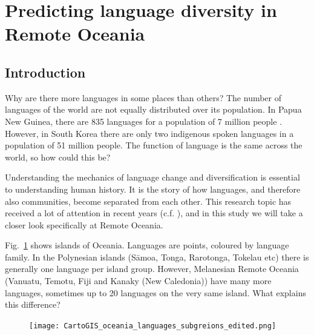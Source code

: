 \documentclass[a4paper,10pt]{article} %
\begin{document}
\newpage
{}



\newpage
\doublespacing
\section{Predicting language diversity in Remote Oceania}
\label{study_pol_complex}
\subsection{Introduction}
\doublespacing
Why are there more languages in some places than others? The number of languages of the world are not equally distributed over its population. In Papua New Guinea, there are 835 languages for a population of 7 million people \citep{ethnologue22, cia_world_factbook_2019}. However, in South Korea there are only two indigenous spoken languages in a population of 51 million people. The function of language is the same across the world, so how could this be?

Understanding the mechanics of language change and diversification is essential to understanding human history. It is the story of how languages, and therefore also communities, become separated from each other. This research topic has received a lot of attention in recent years (c.f. \citet{gavin2017process,  greenhill2015demographic, Pacheco_Coelho_2019, hua2019ecological}), and in this study we will take a closer look specifically at Remote Oceania. 

Fig.~\ref{RO_overnight_coloured_dots} shows islands of Oceania. Languages are points, coloured by language family. In the Polynesian islands (S\={a}moa, Tonga, Rarotonga, Tokelau etc) there is generally one language per island group. However, Melanesian Remote Oceania (Vanuatu, Temotu, Fiji and Kanaky (New Caledonia)) have many more languages, sometimes up to 20 languages on the very same island. What explains this difference?



\begin{figure}
\centering
\texttt{[image: CartoGIS\_oceania\_languages\_subgreions\_edited.png]}
\caption{}
\label{RO_overnight_coloured_dots}
\end{figure}



\end{document}
